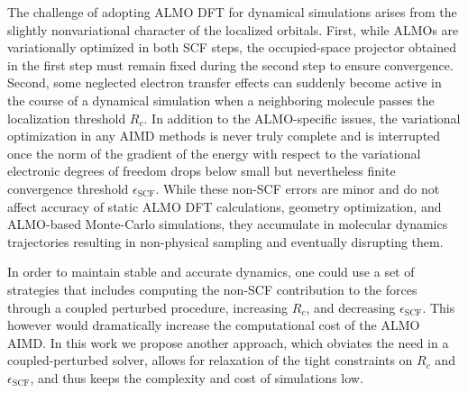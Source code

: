 \documentclass[aps,prl,reprint,amsmath,amssymb]{revtex4-1}
\begin{document}
The challenge of adopting ALMO DFT for dynamical simulations arises from the slightly nonvariational character of the localized orbitals. First, while ALMOs are variationally optimized in both SCF steps, the occupied-space projector obtained in the first step must remain fixed during the second step to ensure convergence. Second, some neglected electron transfer effects can suddenly become active in the course of a dynamical simulation when a neighboring molecule passes the localization threshold $R_{c}$. In addition to the ALMO-specific issues, the variational optimization in any AIMD methods is never truly complete and is interrupted once the norm of the gradient of the energy with respect to the variational electronic degrees of freedom drops below small but nevertheless finite convergence threshold $\epsilon_{\text{SCF}}$. While these non-SCF errors are minor and do not affect accuracy of static ALMO DFT calculations, geometry optimization, and ALMO-based Monte-Carlo simulations, they accumulate in molecular dynamics trajectories resulting in non-physical sampling and eventually disrupting them.



In order to maintain stable and accurate dynamics, one could use a set of strategies that includes computing the non-SCF contribution to the forces through a coupled perturbed procedure, increasing $R_{c}$, and decreasing $\epsilon_{\text{SCF}}$. %
This however would dramatically increase the computational cost of the ALMO AIMD. %
%
In this work we propose another approach, which obviates the need in a coupled-perturbed solver, allows for relaxation of the tight constraints on $R_{c}$ and $\epsilon_{\text{SCF}}$, and thus keeps the complexity and cost of simulations low. 
\end{document}
